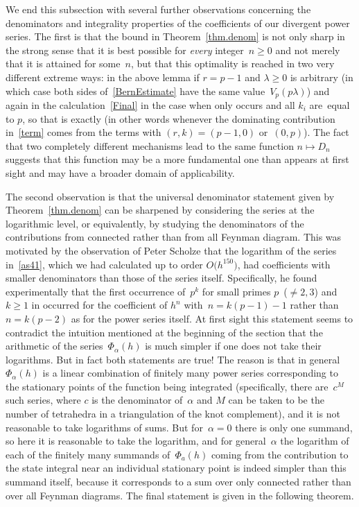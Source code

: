\documentclass[pdftex]{sigma}
\numberwithin{equation}{section}
\def\l{\lambda}
\def\a{\alpha}
\def\l{\lambda}
\def\a{\alpha}
\def\l{\lambda}
\def\O{O}
\begin{document}
We end this subsection with several further observations concerning the denominators
and integrality properties of the coefficients of our divergent power series. The
first is that the bound in Theorem~\ref{thm.denom} is not only sharp in the strong
sense that it is best possible for \emph{every} integer~$n\ge0$ and not merely that
it is attained for some~$n$, but that this optimality is reached in two very
different extreme ways: in the above lemma if $r=p-1$ and $\l\ge0$ is arbitrary
(in which case both sides of~\eqref{BernEstimate} have the same value~$V_p(p\l)$)
and again in the calculation~\eqref{Final} in the case when only  occurs
and all $k_i$ are~equal to $p$, so that  is exactly  (in
other words whenever the dominating contribution in~\eqref{term} comes from the
terms with $(r,k)=(p-1,0)$ or~$(0,p)$). The fact that two completely different
mechanisms lead to the same function $n\mapsto D_n$ suggests that this function
may be a more fundamental one than appears at first sight and may have a broader
domain of applicability.

The second observation is that the universal denominator statement given by
Theorem~\ref{thm.denom} can be sharpened by considering the series at the logarithmic
level, or equivalently, by studying the denominators of the contributions from
connected rather than from all Feynman diagram. This was motivated by the observation
of Peter Scholze that the logarithm of the series  in~\eqref{as41},
which we had calculated up to order $ \O\big(h^{150}\big)$, had coefficients with smaller
denominators than those of the series itself. Specifically, he found experimentally
that the first occurrence of~$p^k$ for small primes $p$~($\ne2, 3$) and $k\ge1$ in
 occurred for the coefficient of $h^n$ with~${n=k(p-1)-1}$
rather than $n=k(p-2)$ as for the power series  itself.
At first sight this statement seems to contradict the intuition mentioned at the
beginning of the section that the arithmetic of the series~$\Phi_\a(h)$ is much
simpler if one does not take their logarithms. But in fact both statements are true!
The reason is that in general $\Phi_\a(h)$ is a linear combination of finitely
many power series corresponding to the stationary points of the function being
integrated (specifically, there are~$c^M$ such series, where $c$ is the denominator
of~$\a$ and $M$ can be taken to be the number of tetrahedra in a triangulation of
the knot complement), and it is not reasonable to take logarithms of sums. But
for~$\a=0$ there is only one summand, so here it is reasonable to take the logarithm,
and for general~$\a$ the logarithm of each of the finitely many summands of~$\Phi_a(h)$ coming from the contribution to the state integral near an individual
stationary point is indeed simpler than this summand itself, because it corresponds
to a sum over only connected rather than over all Feynman diagrams. The final
statement is given in the following theorem.
\end{document}
